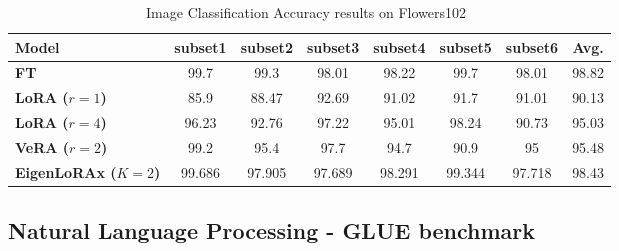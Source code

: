 \begin{table}[h]
    \centering
    \caption{Image Classification Accuracy results on Flowers102~\citep{flowers102}}
    \begin{tabular}{lccccccc}
        \toprule
        \textbf{Model}  & \textbf{subset1} & \textbf{subset2} & \textbf{subset3} & \textbf{subset4} & \textbf{subset5} & \textbf{subset6} & \textbf{Avg.} \\ 
        \midrule
        \textbf{FT}                          & 99.7                        & 99.3                        & 98.01                       & 98.22                       & 99.7                        & 98.01                       & 98.82          \\
\textbf{LoRA ($r=1$)}                   & 85.9                        & 88.47                       & 92.69                       & 91.02                       & 91.7                        & 91.01                       & 90.13          \\
\textbf{LoRA ($r=4$)}                  & 96.23                       & 92.76                       & 97.22                       & 95.01                       & 98.24                       & 90.73                       & 95.03         \\
\textbf{VeRA ($r=2$)}                & 99.2                        & 95.4                        & 97.7                        & 94.7                        & 90.9                        & 95                          & 95.48        \\
\textbf{EigenLoRAx ($K=2$)}                    & 99.686                      & 97.905                      & 97.689                      & 98.291                      & 99.344                      & 97.718                      & 98.43         \\
            \bottomrule
    \end{tabular}
    \label{tab:appendix_flowers102}
\end{table}
\FloatBarrier


\subsection{Natural Language Processing - GLUE benchmark}~\label{appendix:glue}

